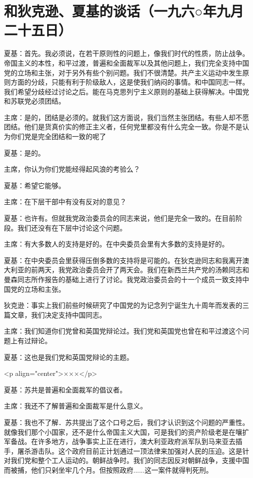 \section[和狄克逊、夏基的谈话（一九六○年九月二十五日）]{和狄克逊、夏基的谈话（一九六○年九月二十五日）}


夏基：首先。我必须说，在若干原则性的问题上，像我们时代的性质，防止战争。帝国主义的本性，和平过渡，普遍和全面裁军以及其他问题上，我们完全支持中国党的立场和主张，对于另外有些个别问题。我们不很清楚。共产主义运动中发生原则方面的分歧，只能有利于阶级敌人，这是使我们纳闷的事情。和中国同志一样。我们希望分歧经过讨论之后。能在马克思列宁主义原则的基础上获得解决。中国党和苏联党必须团结。

主席：是的，团结是必须的。就我们这方面说，我们当然主张团结。有些人却不愿团结。他们是货真价实的修正主义者，任何党里都没有什么完全一致。你是不是认为你们党是完全团结和一致的呢了

夏基：是的。

主席，你认为你们党能经得起风浪的考验么？

夏基：希望它能够。

主席：在下层干部中有没有反对的意见？

夏基：也许有。但就我党政治委员会的同志来说，他们是完全一致的。在目前阶段。我们还没有在下层中讨论这个问题。

主席：有大多数人的支持是好的。在中央委员会里有大多数的支持是好的。

夏基：在中央委员会里获得压倒多数的支持将是可能的。在狄克逊同志和我离开澳大利亚的前两天，我党政治委员会开了两天会。我们在新西兰共产党的汤赖同志和曼森同志所作报告的基础上进行了讨论。我党政治委员会的十一个成员一致支持中国党的立场和主张。

狄克逊：事实上我们前些时候研究了中国党的为记念列宁诞生九十周年而发表的三篇文章，我们决定支持中国同志。

主席：我们知道你们党曾和英国党辩论过。我们党和英国党也曾在和平过渡这个问题上有过辩论。

夏基：这也是我们党和英国党辩论的主题。

<p align="center">×××</p>

夏基：苏共是普遍和全面裁军的倡议者。

主席：我还不了解普遍和全面裁军是什么意义。

夏基：我也不了解．苏共提出了这个口号之后，我们才认识到这个问题的严重性。就像我们那个小国家，还不是什么帝国主义大国，可是我们的资产阶级老是在嚷扩军备战。在许多地方，战争事实上正在进行，澳大利亚政府派军队到马来亚去插手，屠杀游击队。这个政府目前正计划通过一顶法律来加强对人民的压迫。这是针对我们党和整个工人运动的。朝鲜战争时。我们的同志因反对朝鲜战争，支援中国而被捕，他们只剁坐牢几个月。但按照政府......这一案件就得判死刑。

